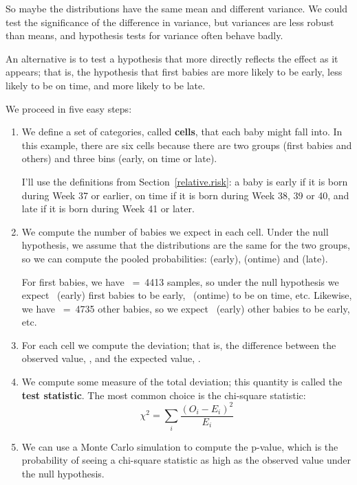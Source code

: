 \documentclass[12pt]{book}
\begin{document}
So maybe the distributions have the same mean and different variance.
We could test the significance of the difference in variance, but
variances are less robust than means, and hypothesis tests for
variance often behave badly.

An alternative is to test a hypothesis that more directly reflects the
effect as it appears; that is, the hypothesis that first babies are
more likely to be early, less likely to be on time, and more likely to
be late.

We proceed in five easy steps:

\begin{enumerate}

\item We define a set of categories, called {\bf cells}, that each
  baby might fall into.  In this example, there are six cells because
  there are two groups (first babies and others) and three bins
  (early, on time or late).

I'll use the definitions from Section~\ref{relative.risk}: a baby is
early if it is born during Week 37 or earlier, on time if it is born
during Week 38, 39 or 40, and late if it is born during Week 41 or
later.

\item We compute the number of babies we expect in each cell.  Under
  the null hypothesis, we assume that the distributions are the same
  for the two groups, so we can compute the pooled probabilities:
  \Prob(early), \Prob(ontime) and \Prob(late).

For first babies, we have \n~=~4413 samples, so under the null
hypothesis we expect \n~\Prob(early) first babies to be early,
\n~\Prob(ontime) to be on time, etc.  Likewise, we have \m~=~4735
other babies, so we expect \m~\Prob(early) other babies to be
early, etc.

\item For each cell we compute the deviation; that is, the difference
  between the observed value, \OO{}, and the expected value, \E{}.

\item We compute some measure of the total deviation; this quantity
is called the {\bf test statistic}.  The most common
choice is the chi-square statistic:
%
\[ \chi^2 = \sum_i \frac{(O_i - E_i)^2}{E_i} \]
%

\item We can use a Monte Carlo simulation to compute the p-value,
  which is the probability of seeing a chi-square statistic as high
  as the observed value under the null hypothesis.

\end{enumerate}
\end{document}
